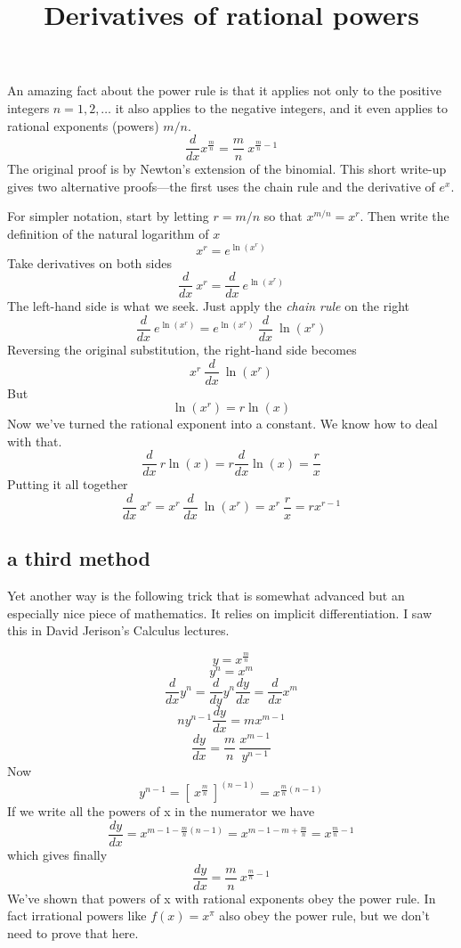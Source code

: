 \documentclass[11pt, oneside]{article}   	%
\title{Derivatives of rational powers}
\date{}							%
\begin{document}
\large
\maketitle
An amazing fact about the power rule is that it applies not only to the positive integers $n=1,2,\dots$ it also applies to the negative integers, and it even applies to rational exponents (powers) $m/n$.  
\[ \frac{d}{dx} x^{\frac{m}{n}} = \frac{m}{n} \  x^{\frac{m}{n} - 1}  \]
The original proof is by Newton's extension of the binomial.  This short write-up gives two alternative proofs---the first uses the chain rule and the derivative of $e^x$.

For simpler notation, start by letting $r = m/n$ so that $x^{m/n} = x^r$.  Then write the definition of the natural logarithm of $x$
\[ x^r = e^{\ln(x^r)} \]
Take derivatives on both sides
\[ \frac{d}{dx} \ x^r = \frac{d}{dx} \  e^{\ln(x^r)} \]
The left-hand side is what we seek.  Just apply the \emph{chain rule} on the right
\[ \frac{d}{dx} \  e^{\ln(x^r)} = e^{\ln(x^r)} \ \frac{d}{dx} \ \ln(x^r)  \]
Reversing the original substitution, the right-hand side becomes
\[ x^r  \ \frac{d}{dx} \ \ln(x^r)  \]
But
\[  \ln(x^r)  =  r \ln(x) \]
Now we've turned the rational exponent into a constant.  We know how to deal with that.
\[  \frac{d}{dx} \ r \ln(x) = r \frac{d}{dx} \ln(x) = \frac{r}{x} \]
Putting it all together
\[ \frac{d}{dx} \  x^r  = x^r  \ \frac{d}{dx} \ \ln(x^r) = x^r  \ \frac{r}{x} = r x^{r-1} \]

\subsection*{a third method}

Yet another way is the following trick that is somewhat advanced but an especially nice piece of mathematics.  It relies on implicit differentiation.  I saw this in David Jerison's Calculus lectures.

\[ y = x^{\frac{m}{n}} \] 
\[ y^n = x^m \]
\[ \frac{d}{dx} y^n = \frac{d}{dy} y^n \frac{dy}{dx} = \frac{d}{dx} x^m \]
\[ ny^{n-1} \frac{dy}{dx} = mx^{m-1} \]
\[  \frac{dy}{dx} = \frac{m}{n} \ \frac{ x^{m-1}}{y^{n-1}} \]
Now 
\[ y^{n-1} = [\ x^{\frac{m}{n}}\ ]^{(n-1)} = x^{\frac{m}{n}(n-1)}\]
If we write all the powers of x in the numerator we have
\[ \frac{dy}{dx} = x^{m-1 - \frac{m}{n}(n-1)} = x^{m - 1 - m + \frac{m}{n}} = x^{\frac{m}{n} - 1}\]
which gives finally
\[ \frac{dy}{dx} = \frac{m}{n} \  x^{\frac{m}{n} - 1} \]
We've shown that powers of x with rational exponents obey the power rule.  In fact irrational powers like $f(x) = x^\pi$ also obey the power rule, but we don't need to prove that here.
\end{document}

